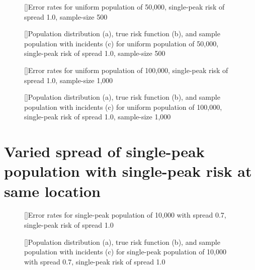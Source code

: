 {%

\begin{figure}[!htb]
    
    []{Error rates for uniform population of 50,000, single-peak risk of \gls{spread} 1.0, sample-size 500}
    \label{tab:mean_error_rates:unif50k_500_1.0_1h}
    
    []{Population distribution (a), true risk function (b), and sample population with incidents (c) for uniform population of 50,000, single-peak risk of \gls{spread} 1.0, sample-size 500}
    \label{fig:distributions:unif50k_500_1.0_1h}    
\end{figure}



\begin{figure}[!htb]
    
    []{Error rates for uniform population of 100,000, single-peak risk of \gls{spread} 1.0, sample-size 1,000}
    \label{tab:mean_error_rates:unif100k_1000_1.0_1h}
    
    []{Population distribution (a), true risk function (b), and sample population with incidents (c) for uniform population of 100,000, single-peak risk of \gls{spread} 1.0, sample-size 1,000}
    \label{fig:distributions:unif100k_1000_1.0_1h}    
\end{figure}



\section{Varied spread of single-peak population with single-peak risk at same location}
\label{sec:app:results_pX_100_1.0_1h}


\begin{figure}[!htb]
    
    []{Error rates for single-peak population of 10,000 with \gls{spread} 0.7, single-peak risk of \gls{spread} 1.0}
    \label{tab:mean_error_rates:p0.7_100_1.0_1h}
    
    []{Population distribution (a), true risk function (b), and sample population with incidents (c) for single-peak population of 10,000 with \gls{spread} 0.7, single-peak risk of \gls{spread} 1.0}
    \label{fig:distributions:p0.7_100_1.0_1h}    
\end{figure}

}
